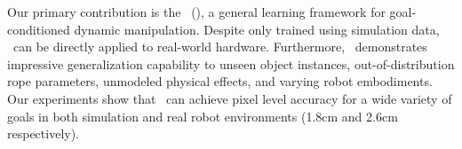 Our  primary contribution is the \namel~(\names), a general learning framework for goal-conditioned dynamic manipulation. 
Despite only trained using simulation data, \names~can be directly applied to real-world hardware. Furthermore, \names~demonstrates impressive generalization capability to unseen object instances, out-of-distribution rope parameters, unmodeled physical effects, and varying robot embodiments.
Our experiments show that \names~can achieve pixel level accuracy for a wide variety of goals in both simulation and real robot environments (1.8cm and 2.6cm respectively).


    



